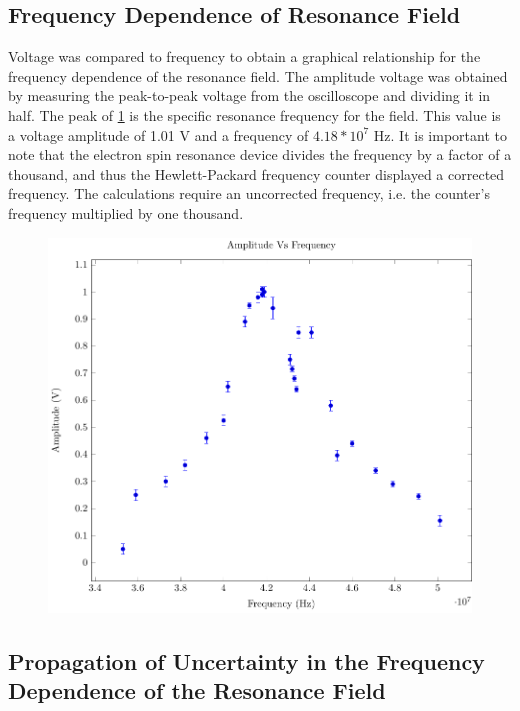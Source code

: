 \documentclass[a4paper]{article}
\begin{document}
\subsection{Frequency Dependence of Resonance Field}

\qq Voltage was compared to frequency to obtain a graphical
relationship for the frequency dependence of the resonance field. The
amplitude voltage was obtained by measuring the peak-to-peak voltage
from the oscilloscope and dividing it in half. The peak of
\ref{FrequencyDependence} is the specific resonance frequency for the
field. This value is a voltage amplitude of 1.01 V and a frequency of
$4.18*10^7$ Hz. It is important to note that the electron spin
resonance device divides the frequency by a factor of a thousand, and
thus the Hewlett-Packard frequency counter displayed a corrected
frequency. The calculations require an uncorrected frequency, i.e. the
counter's frequency multiplied by one thousand.
\begin{figure}[H]
\centering
\includegraphics[width=1.0\textwidth]{Plots/ExpFreqVsVolt/freq_depen.pdf}
\label{FrequencyDependence}
\end{figure}

\subsection{Propagation of Uncertainty in the Frequency Dependence of the Resonance Field}
\end{document}
